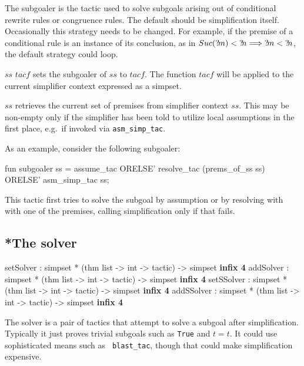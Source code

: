 The subgoaler is the tactic used to solve subgoals arising out of
conditional rewrite rules or congruence rules.  The default should be
simplification itself.  Occasionally this strategy needs to be
changed.  For example, if the premise of a conditional rule is an
instance of its conclusion, as in $Suc({?\!m}) < {?\!n} \Longrightarrow {?\!m}
< {?\!n}$, the default strategy could loop.

\begin{ttdescription}
  
\item[$ss$ \ttindexbold{setsubgoaler} $tacf$] sets the subgoaler of
  $ss$ to $tacf$.  The function $tacf$ will be applied to the current
  simplifier context expressed as a simpset.
  
\item[\ttindexbold{prems_of_ss} $ss$] retrieves the current set of
  premises from simplifier context $ss$.  This may be non-empty only
  if the simplifier has been told to utilize local assumptions in the
  first place, e.g.\ if invoked via \texttt{asm_simp_tac}.

\end{ttdescription}

As an example, consider the following subgoaler:
\begin{ttbox}
fun subgoaler ss =
    assume_tac ORELSE'
    resolve_tac (prems_of_ss ss) ORELSE'
    asm_simp_tac ss;
\end{ttbox}
This tactic first tries to solve the subgoal by assumption or by
resolving with with one of the premises, calling simplification only
if that fails.


\subsection{*The solver}\label{sec:simp-solver}
\begin{ttbox}
setSolver  : simpset * (thm list -> int -> tactic) -> simpset \hfill{\bf infix 4}
addSolver  : simpset * (thm list -> int -> tactic) -> simpset \hfill{\bf infix 4}
setSSolver : simpset * (thm list -> int -> tactic) -> simpset \hfill{\bf infix 4}
addSSolver : simpset * (thm list -> int -> tactic) -> simpset \hfill{\bf infix 4}
\end{ttbox}

The solver is a pair of tactics that attempt to solve a subgoal after
simplification.  Typically it just proves trivial subgoals such as
\texttt{True} and $t=t$.  It could use sophisticated means such as {\tt
  blast_tac}, though that could make simplification expensive.

